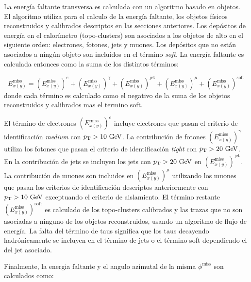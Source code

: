 La energía faltante transversa es calculada con un algoritmo basado en objetos\cite{Khoo:2012749}.
El algoritmo utiliza para el calculo de la energía faltante, los objetos físicos
reconstruidos y calibrados descriptos en las secciones anteriores. Los depósitos
de energía en el calorímetro (topo-clusters) son asociados a los objetos de alto
{\pt} en el siguiente orden: electrones, fotones, jets y muones. Los depósitos
que no están asociados a ningún objeto son incluidos en el término \emph{soft}.
La energía faltante es calculada entonces como la suma de los distintos
términos:

\begin{equation}
  E^{\mathrm{miss}}_{x(y)} = (E^{\mathrm{miss}}_{x(y)})^e + (E^{\mathrm{miss}}_{x(y)})^\gamma + (E^{\mathrm{miss}}_{x(y)})^{\text{jet}} + (E^{\mathrm{miss}}_{x(y)})^{\mu} + (E^{\mathrm{miss}}_{x(y)})^{\mathrm{soft}}
\end{equation}
%
donde cada término es calculado como el negativo de la suma de los objetos reconstruidos y
calibrados mas el termino soft.

El término de electrones $(E^{\mathrm{miss}}_{x(y)})^e$ incluye electrones que
pasan el criterio de identificación \emph{medium} con $\pt>10\gev$. La
contribución de fotones $(E^{\mathrm{miss}}_{x(y)})^{\gamma}$ utiliza los
fotones que pasan el criterio de identificación \emph{tight} con $\pt>20\gev$.
En la contribución de jets se incluyen los jets con $\pt>20\gev$ en
$(E^{\mathrm{miss}}_{x(y)})^{\text{jet}}$. La contribución de muones son
incluidos en $(E^{\mathrm{miss}}_{x(y)})^{\mu}$ utilizando los muones que pasan
los criterios de identificación descriptos anteriormente con $\pt>10\gev$
exceptuando el criterio de aislamiento. El término restante
$(E^{\mathrm{miss}}_{x(y)})^{\mathrm{soft}}$ es calculado de los topo-clusters
calibrados y las trazas que no son asociadas a ninguno de los objetos
reconstruidos, usando un algoritmo de flujo de energía.
La falta del término de taus significa que los taus decayendo hadrónicamente se
incluyen en el término de jets o el término soft dependiendo el {\pt} del jet
asociado.


Finalmente, la energia faltante {\met} y el angulo azimutal de la misma
$\phi^\mathrm{miss}$ son calculados como:

